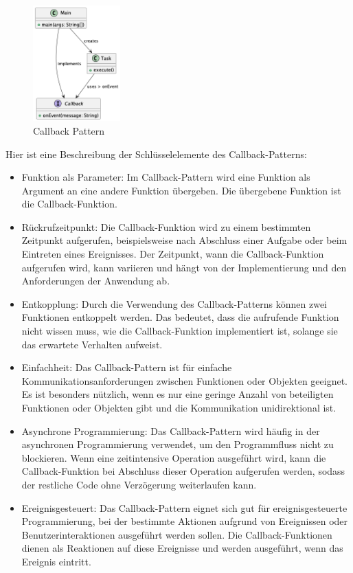 \begin{figure}[!ht]
  \centering
  \includegraphics[width=0.30\textwidth]{fig/uml/callback-class.png}
  \caption{Callback Pattern}
  \label{fig:callback-class}
\end{figure}

Hier ist eine Beschreibung der Schlüsselelemente des Callback-Patterns:
\begin{itemize}
\item Funktion als Parameter: Im Callback-Pattern wird eine Funktion als Argument an eine andere Funktion übergeben. Die übergebene Funktion ist die Callback-Funktion.
\item Rückrufzeitpunkt: Die Callback-Funktion wird zu einem bestimmten Zeitpunkt aufgerufen, beispielsweise nach Abschluss einer Aufgabe oder beim Eintreten eines Ereignisses. Der Zeitpunkt, wann die Callback-Funktion aufgerufen wird, kann variieren und hängt von der Implementierung und den Anforderungen der Anwendung ab.
\item Entkopplung: Durch die Verwendung des Callback-Patterns können zwei Funktionen entkoppelt werden. Das bedeutet, dass die aufrufende Funktion nicht wissen muss, wie die Callback-Funktion implementiert ist, solange sie das erwartete Verhalten aufweist.
\item Einfachheit: Das Callback-Pattern ist für einfache Kommunikationsanforderungen zwischen Funktionen oder Objekten geeignet. Es ist besonders nützlich, wenn es nur eine geringe Anzahl von beteiligten Funktionen oder Objekten gibt und die Kommunikation unidirektional ist.
\item Asynchrone Programmierung: Das Callback-Pattern wird häufig in der asynchronen Programmierung verwendet, um den Programmfluss nicht zu blockieren. Wenn eine zeitintensive Operation ausgeführt wird, kann die Callback-Funktion bei Abschluss dieser Operation aufgerufen werden, sodass der restliche Code ohne Verzögerung weiterlaufen kann.
\item Ereignisgesteuert: Das Callback-Pattern eignet sich gut für ereignisgesteuerte Programmierung, bei der bestimmte Aktionen aufgrund von Ereignissen oder Benutzerinteraktionen ausgeführt werden sollen. Die Callback-Funktionen dienen als Reaktionen auf diese Ereignisse und werden ausgeführt, wenn das Ereignis eintritt.
\end{itemize}
